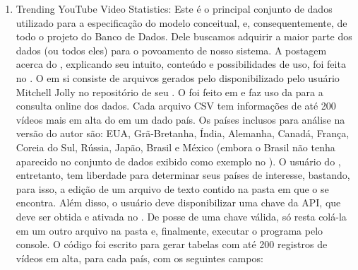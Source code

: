 \begin{enumerate}
  \item Trending YouTube Video Statistics: Este é o principal conjunto de dados utilizado para a especificação do modelo conceitual, e, consequentemente, de todo o projeto do Banco de Dados. Dele buscamos adquirir a maior parte dos dados (ou todos eles) para o povoamento de nosso sistema. A postagem acerca do , explicando seu intuito, conteúdo e possibilidades de uso, foi feita no \href{https://www.kaggle.com/datasets/datasnaek/youtube-new}{}. O  em si consiste de arquivos  gerados pelo  disponibilizado pelo usuário Mitchell Jolly no repositório \href{https://github.com/mitchelljy/Trending-YouTube-Scraper}{} de seu \href{https://github.com/mitchelljy}{}. O  foi feito em  e faz uso da \href{https://developers.google.com/youtube/v3/docs?hl=pt-br}{} para a consulta online dos dados. Cada arquivo CSV tem informações de até 200 vídeos mais em alta do  em um dado país. Os países inclusos para análise na versão do autor são: EUA, Grã-Bretanha, Índia, Alemanha, Canadá, França, Coreia do Sul, Rússia, Japão, Brasil e México (embora o Brasil não tenha aparecido no conjunto de dados exibido como exemplo no ). O usuário do , entretanto, tem liberdade para determinar seus países de interesse, bastando, para isso, a edição de um arquivo de texto contido na pasta em que o  se encontra. Além disso, o usuário deve disponibilizar uma chave da API, que deve ser obtida e ativada no . De posse de uma chave válida, só resta colá-la em um outro arquivo  na pasta e, finalmente, executar o programa pelo console. O código foi escrito para gerar tabelas com até 200 registros de vídeos em alta, para cada país, com os seguintes campos:


\end{enumerate}
